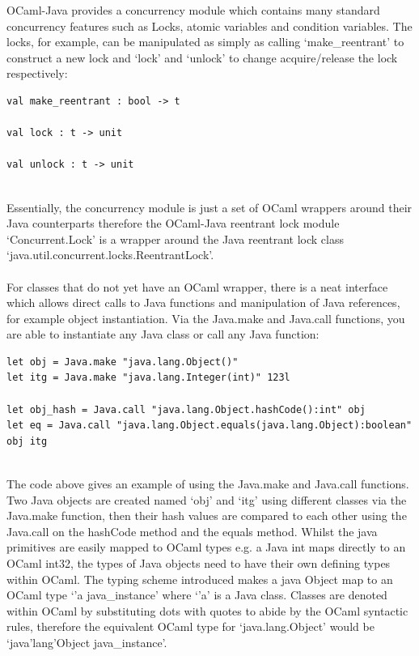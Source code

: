 \documentclass[12pt,twoside,notitlepage]{report}
\begin{document}
%
%
OCaml-Java provides a concurrency module which contains many standard concurrency features such as Locks, atomic variables and condition variables. The locks, for example, can be manipulated as simply as calling `make\_reentrant' to
construct a new lock and `lock' and `unlock' to change acquire/release the lock respectively:
\\
\begin{lstlisting}
val make_reentrant : bool -> t

val lock : t -> unit

val unlock : t -> unit
\end{lstlisting}
\hfill\\
Essentially, the concurrency module is just a set of OCaml wrappers around their Java counterparts\cite{web:clerc2013} therefore the OCaml-Java reentrant lock module `Concurrent.Lock' is a wrapper around the Java reentrant lock class
`java.util.concurrent.locks.ReentrantLock'.
\\
\\
%
%
For classes that do not yet have an OCaml wrapper, there is a neat interface which allows direct calls to Java functions and manipulation of Java references, for example object instantiation. Via the Java.make and Java.call functions,
you are able to instantiate any Java class or call any Java function:
\\
\begin{lstlisting}
let obj = Java.make "java.lang.Object()"
let itg = Java.make "java.lang.Integer(int)" 123l

let obj_hash = Java.call "java.lang.Object.hashCode():int" obj
let eq = Java.call "java.lang.Object.equals(java.lang.Object):boolean" obj itg
\end{lstlisting}
\hfill\\
The code above gives an example of using the Java.make and Java.call functions. Two Java objects are created named `obj' and `itg' using different classes via the Java.make
function, then their hash values are compared to each other using the Java.call on the hashCode method and the equals method. Whilst the java primitives are easily mapped to OCaml types e.g. a Java int maps directly to an OCaml int32,
the types of Java objects need to have their own defining types within OCaml. The typing scheme introduced makes a java Object map to an OCaml type `'a java\_instance' where `'a' is a Java class. Classes are denoted within OCaml by
substituting dots with quotes to abide by the OCaml syntactic rules\cite{web:clerc2013}, therefore the equivalent OCaml type for `java.lang.Object' would be `java'lang'Object java\_instance'.
\\
\\
\end{document}
